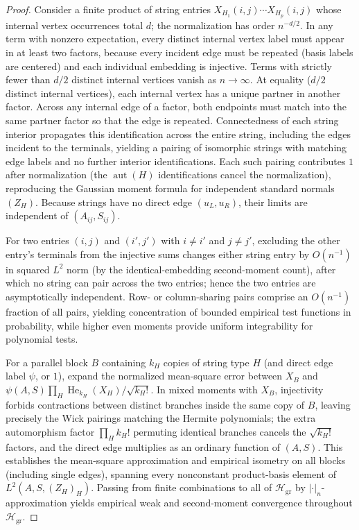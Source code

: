 \documentclass[11pt]{article}
\theoremstyle{plain}
\theoremstyle{definition}
\theoremstyle{remark}
\DeclareMathOperator{\aut}{aut}
\DeclareMathOperator{\He}{He}
\begin{document}
\begin{proof}
Consider a finite product of string entries $X_{H_1}(i,j) \cdots X_{H_p}(i,j)$ whose internal vertex occurrences total $d$; the normalization has order $n^{-d/2}$.
In any term with nonzero expectation, every distinct internal vertex label must appear in at least two factors, because every incident edge must be repeated (basis labels are centered) and each individual embedding is injective.
Terms with strictly fewer than $d/2$ distinct internal vertices vanish as $n \to \infty$.
At equality ($d/2$ distinct internal vertices), each internal vertex has a unique partner in another factor. Across any internal edge of a factor, both endpoints must match into the same partner factor so that the edge is repeated. Connectedness of each string interior propagates this identification across the entire string, including the edges incident to the terminals, yielding a pairing of isomorphic strings with matching edge labels and no further interior identifications. Each such pairing contributes $1$ after normalization (the $\aut(H)$ identifications cancel the normalization), reproducing the Gaussian moment formula for independent standard normals $(Z_H)$. Because strings have no direct edge $(u_L, u_R)$, their limits are independent of $(A_{ij}, S_{ij})$.

For two entries $(i,j)$ and $(i',j')$ with $i \neq i'$ and $j \neq j'$, excluding the other entry's terminals from the injective sums changes either string entry by $O(n^{-1})$ in squared $L^2$ norm (by the identical-embedding second-moment count), after which no string can pair across the two entries; hence the two entries are asymptotically independent. Row- or column-sharing pairs comprise an $O(n^{-1})$ fraction of all pairs, yielding concentration of bounded empirical test functions in probability, while higher even moments provide uniform integrability for polynomial tests.

For a parallel block $B$ containing $k_H$ copies of string type $H$ (and direct edge label $\psi$, or $1$), expand the normalized mean-square error between $X_B$ and $\psi(A,S)\prod_H \He_{k_H}(X_H)/\sqrt{k_H!}$. In mixed moments with $X_B$, injectivity forbids contractions between distinct branches inside the same copy of $B$, leaving precisely the Wick pairings matching the Hermite polynomials; the extra automorphism factor $\prod_H k_H!$ permuting identical branches cancels the $\sqrt{k_H!}$ factors, and the direct edge multiplies as an ordinary function of $(A, S)$. This establishes the mean-square approximation and empirical isometry on all blocks (including single edges), spanning every nonconstant product-basis element of $L^2(A, S, (Z_H)_H)$. Passing from finite combinations to all of $\mathcal{H}_{\mathrm{gr}}$ by $|\cdot|_n$-approximation yields empirical weak and second-moment convergence throughout $\mathcal{H}_{\mathrm{gr}}$.
\end{proof}
\end{document}
